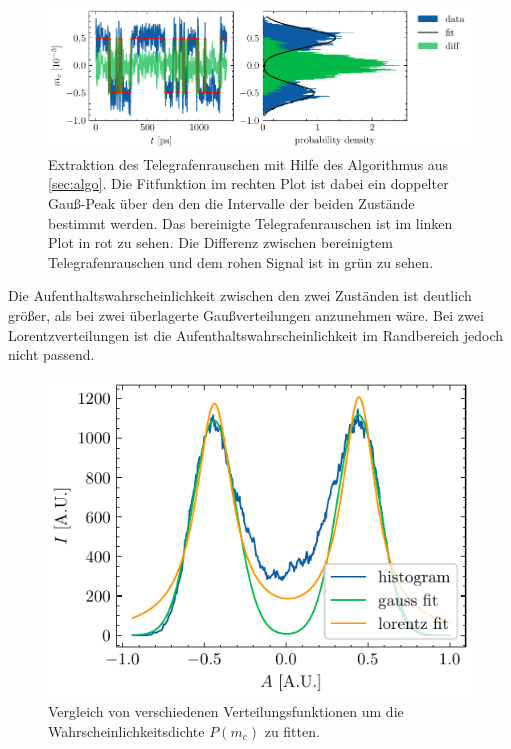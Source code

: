 \documentclass[main.tex]{subfiles}
\begin{document}
\begin{figure}[H]
    \centering
    \includegraphics{bilder/plots/Bz_0mT/mc_fit_hist_part2_26.03meV.pdf}
    \caption[Extraktion des Telegrafenrauschen mit Hilfe des Algorithmus aus \cref{sec:algo}]{Extraktion des Telegrafenrauschen mit Hilfe des Algorithmus aus \cref{sec:algo}. Die Fitfunktion im rechten Plot ist dabei ein doppelter Gauß-Peak über den den die Intervalle der beiden Zustände bestimmt werden. Das bereinigte Telegrafenrauschen ist im linken Plot in rot zu sehen. Die Differenz zwischen bereinigtem Telegrafenrauschen und dem rohen Signal ist in grün zu sehen.}\label{fig:extraktion-tgr}
\end{figure}

Die Aufenthaltswahrscheinlichkeit zwischen den zwei Zuständen ist deutlich größer, als bei zwei überlagerte Gaußverteilungen anzunehmen wäre. Bei zwei Lorentzverteilungen ist die Aufenthaltswahrscheinlichkeit im Randbereich jedoch nicht passend.
\begin{figure}[H]
    \centering
    \includegraphics{bilder/plots/theo-vis/hist_fit_comp.pdf}
    \caption{Vergleich von verschiedenen Verteilungsfunktionen um die Wahrscheinlichkeitsdichte $P(m_c)$ zu fitten.}\label{fig:fit_func_comp}
\end{figure}
\end{document}
